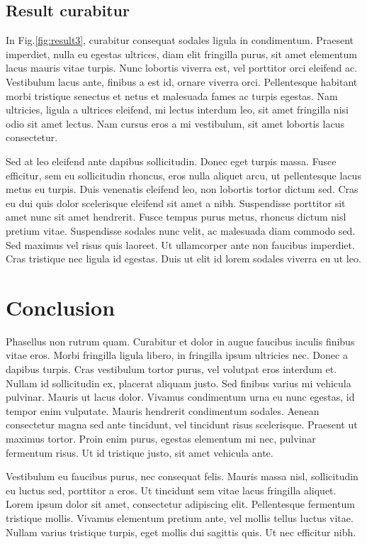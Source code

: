 \documentclass[11pt,oneside,openright]{book}
\begin{document}

\section{Result curabitur}

In Fig.\ref{fig:result3}, curabitur consequat sodales ligula in condimentum. Praesent imperdiet, nulla eu egestas ultrices, diam elit fringilla purus, sit amet elementum lacus mauris vitae turpis. Nunc lobortis viverra est, vel porttitor orci eleifend ac. Vestibulum lacus ante, finibus a est id, ornare viverra orci. Pellentesque habitant morbi tristique senectus et netus et malesuada fames ac turpis egestas. Nam ultricies, ligula a ultrices eleifend, mi lectus interdum leo, sit amet fringilla nisi odio sit amet lectus. Nam cursus eros a mi vestibulum, sit amet lobortis lacus consectetur.


Sed at leo eleifend ante dapibus sollicitudin. Donec eget turpis massa. Fusce efficitur, sem eu sollicitudin rhoncus, eros nulla aliquet arcu, ut pellentesque lacus metus eu turpis. Duis venenatis eleifend leo, non lobortis tortor dictum sed. Cras eu dui quis dolor scelerisque eleifend sit amet a nibh. Suspendisse porttitor sit amet nunc sit amet hendrerit. Fusce tempus purus metus, rhoncus dictum nisl pretium vitae. Suspendisse sodales nunc velit, ac malesuada diam commodo sed. Sed maximus vel risus quis laoreet. Ut ullamcorper ante non faucibus imperdiet. Cras tristique nec ligula id egestas. Duis ut elit id lorem sodales viverra eu ut leo.

\chapter{Conclusion}\label{cpt:con}

Phasellus non rutrum quam. Curabitur et dolor in augue faucibus iaculis finibus vitae eros. Morbi fringilla ligula libero, in fringilla ipsum ultricies nec. Donec a dapibus turpis. Cras vestibulum tortor purus, vel volutpat eros interdum et. Nullam id sollicitudin ex, placerat aliquam justo. Sed finibus varius mi vehicula pulvinar. Mauris ut lacus dolor. Vivamus condimentum urna eu nunc egestas, id tempor enim vulputate. Mauris hendrerit condimentum sodales. Aenean consectetur magna sed ante tincidunt, vel tincidunt risus scelerisque. Praesent ut maximus tortor. Proin enim purus, egestas elementum mi nec, pulvinar fermentum risus. Ut id tristique justo, sit amet vehicula ante.

Vestibulum eu faucibus purus, nec consequat felis. Mauris massa nisl, sollicitudin eu luctus sed, porttitor a eros. Ut tincidunt sem vitae lacus fringilla aliquet. Lorem ipsum dolor sit amet, consectetur adipiscing elit. Pellentesque fermentum tristique mollis. Vivamus elementum pretium ante, vel mollis tellus luctus vitae. Nullam varius tristique turpis, eget mollis dui sagittis quis. Ut nec efficitur nibh.





\end{document}
